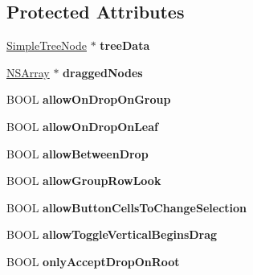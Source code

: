 \subsection*{Protected Attributes}
\begin{DoxyCompactItemize}
\item 
\hypertarget{interface_tree_controller_a48f8be4cde3d8ed6b7db36ac6f5af172}{
\hyperlink{class_simple_tree_node}{SimpleTreeNode} $\ast$ {\bfseries treeData}}
\label{interface_tree_controller_a48f8be4cde3d8ed6b7db36ac6f5af172}

\item 
\hypertarget{interface_tree_controller_a0e4d96c5cf20c953efa40bfddf406fa9}{
\hyperlink{class_n_s_array}{NSArray} $\ast$ {\bfseries draggedNodes}}
\label{interface_tree_controller_a0e4d96c5cf20c953efa40bfddf406fa9}

\item 
\hypertarget{interface_tree_controller_acac652ada6b3c3bb20183c5722b7e5ff}{
BOOL {\bfseries allowOnDropOnGroup}}
\label{interface_tree_controller_acac652ada6b3c3bb20183c5722b7e5ff}

\item 
\hypertarget{interface_tree_controller_aaf1a538a809c877c5eca406defeb8098}{
BOOL {\bfseries allowOnDropOnLeaf}}
\label{interface_tree_controller_aaf1a538a809c877c5eca406defeb8098}

\item 
\hypertarget{interface_tree_controller_a6975e809d329f4e67eb5cbc02bdfb704}{
BOOL {\bfseries allowBetweenDrop}}
\label{interface_tree_controller_a6975e809d329f4e67eb5cbc02bdfb704}

\item 
\hypertarget{interface_tree_controller_aec4cfc8b183d17681a61a581df7917d0}{
BOOL {\bfseries allowGroupRowLook}}
\label{interface_tree_controller_aec4cfc8b183d17681a61a581df7917d0}

\item 
\hypertarget{interface_tree_controller_af9a816184260f157a7757fd92b286e95}{
BOOL {\bfseries allowButtonCellsToChangeSelection}}
\label{interface_tree_controller_af9a816184260f157a7757fd92b286e95}

\item 
\hypertarget{interface_tree_controller_a83fe02a753318de01afdf84c9061bdf1}{
BOOL {\bfseries allowToggleVerticalBeginsDrag}}
\label{interface_tree_controller_a83fe02a753318de01afdf84c9061bdf1}

\item 
\hypertarget{interface_tree_controller_af394baed1909c31dc106f011ea7e6fa4}{
BOOL {\bfseries onlyAcceptDropOnRoot}}
\label{interface_tree_controller_af394baed1909c31dc106f011ea7e6fa4}


\end{DoxyCompactItemize}
